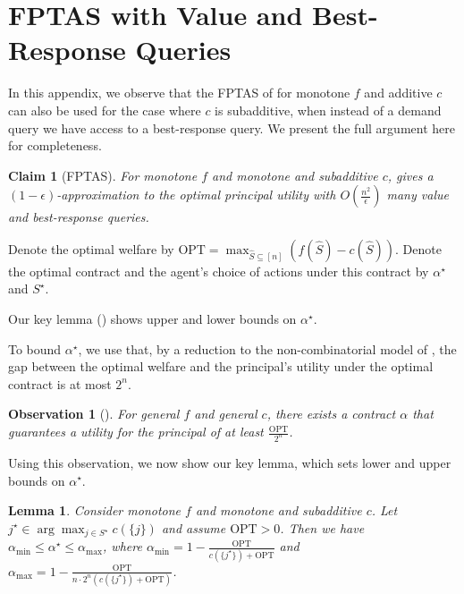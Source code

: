 \documentclass[11pt]{article}
\newtheorem{lemma}{Lemma}
\newtheorem{claim}{Claim}
\newtheorem{observation}{Observation}
\begin{document}
\section{FPTAS with Value and Best-Response Queries}\label{sec:FPTAS_subadditive_c}

\newcommand{\actions}[0]{[n]}
\newcommand{\opt}[0]{\text{OPT}}
In this appendix, we observe that the FPTAS of \cite{multimulti} for monotone $f$ and additive $c$ can also be used for the case where $c$ is subadditive,
when instead of a demand query we have access to a best-response query. We present the full argument here for completeness.

\begin{claim}[FPTAS]\label{cla:FPTAS}
For monotone $f$ and monotone and subadditive $c$,  gives a $(1-\epsilon)$-approximation to the optimal principal utility with $O\left(\frac{n^2}{\epsilon} \right)$ many value and best-response queries.
\end{claim}

Denote the optimal welfare by $\opt = \max_{\hat{S} \subseteq [n]} (f(\hat{S}) - c(\hat{S})).$ Denote the optimal contract and the agent's choice of actions under this contract by $\alpha^\star$ and $S^\star$.

Our key lemma () shows upper and lower bounds on  $\alpha^\star$.

To bound $\alpha^\star$, we use that, by a reduction to the non-combinatorial model of \cite{dutting2019simple}, the gap between the optimal welfare and the principal's utility under the optimal contract is at most $2^n$.

\begin{observation}[\cite{dutting2019simple}]\label{obs:welfare-single}
    For general $f$ and general $c$, there exists a contract $\alpha$ that guarantees a utility for the principal of at least  $\frac{\opt}{2^n}$. 
\end{observation}

Using this observation, we now show our key lemma, which sets lower and upper bounds on $\alpha^\star$.
\begin{lemma}\label{lem:4m}
    Consider monotone $f$ and monotone and subadditive $c$. Let $j^\star \in \arg\max_{j \in S^\star} c(\{j\})$ and assume $\opt > 0$.
    Then we have
    $\alpha_{\min} \leq \alpha^\star \leq  \alpha_{\max}$, where $\alpha_{\min} =1- \frac{\opt}{ c(\{j^\star\}) + \opt}$ and $\alpha_{\max} = 1- \frac{\opt}{n\cdot 2^n (c(\{j^\star\}) + \opt )}$.
\end{lemma}
\end{document}
